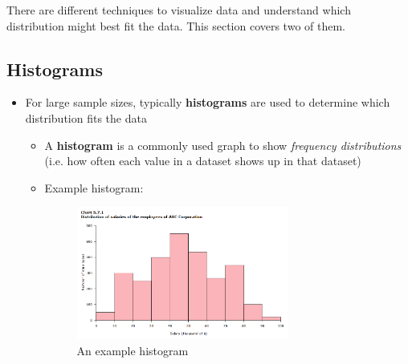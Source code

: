 \documentclass[12pt]{article}
\begin{document}
There are different techniques to visualize data and understand which distribution might best fit the data. This section covers two of them.

\subsection*{Histograms}
\begin{itemize}
	\item For large sample sizes, typically \textbf{histograms} are used to
	      determine which distribution fits the data
	      \begin{itemize}
              \item A \textbf{histogram} is a commonly used graph to show
                  \emph{frequency distributions} (i.e. how often each value in
                  a dataset shows up in that dataset)
		      \item Example histogram:
		            \begin{figure}[H]
			            \begin{center}
				            \includegraphics[width=0.7\textwidth]{1}
			            \end{center}
			            \caption{An example histogram}\label{fig:1}
		            \end{figure}
	      \end{itemize}
\end{itemize}
\end{document}

